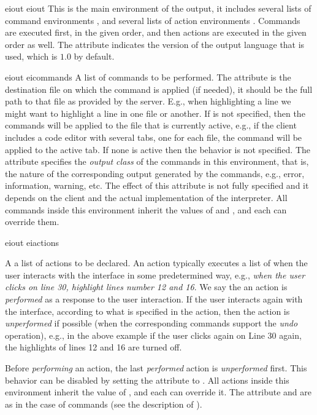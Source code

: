 \bigskip
\xmlstruct
{eiout}
{eiout} 
{%
%
  This is the main environment of the output, it includes several
  lists of command environments , and
  several lists of action environments .
%
  Commands are executed first, in the given order, and then actions are
  executed in the given order as well.
%
  The  attribute indicates the version of the
  output language that is used, which is $1.0$ by default.
%
}


\bigskip
\xmlstruct
{eiout}
{eicommands}
{%
%
A list of commands to be performed.
%
The attribute  is the destination file on which
the command is applied (if needed), it should be the full path to that
file as provided by the \ei server.
%
E.g., when highlighting a line we might want to highlight a line in
one file or another. 
%
If  is not specified, then the commands will be
applied to the file that is currently active, e.g., if the client
includes a code editor with several tabs, one for each file, the
command will be applied to the active tab. If none is active then the
behavior is not specified.
% 
The attribute  specifies the \emph{output
  class} of the commands in this environment, that is, the nature of
the corresponding output generated by the commands, e.g., error,
information, warning, etc. The effect of this attribute is not fully
specified and it depends on the client and the actual implementation
of the interpreter.
%
All commands inside this environment inherit the values of
 and , and each can
override them.
%
}


\bigskip
\xmlstruct
{eiout}
{eiactions}
{%
%
  A a list of actions to be declared. An action typically executes a
  list of  when the user interacts with the
  interface in some predetermined way, e.g., \emph{when the user
    clicks on line 30, highlight lines number 12 and 16}. We say the
  an action is \emph{performed} as a response to the user interaction.
%
  If the user interacts again with the interface, according to what is
  specified in the action, then the action is \emph{unperformed} if
  possible (when the corresponding commands support the \emph{undo}
  operation), e.g., in the above example if the user clicks again on
  Line 30 again, the highlights of lines 12 and 16 are turned off.

  Before \emph{performing} an action, the last \emph{performed} action
  is \emph{unperformed} first. This behavior can be disabled by
  setting the  attribute to
  . All actions inside this environment
  inherit the value of , and each can
  override it.
% 
  The attribute  and  are
  as in the case of commands (see the description of
  ).
%
}


